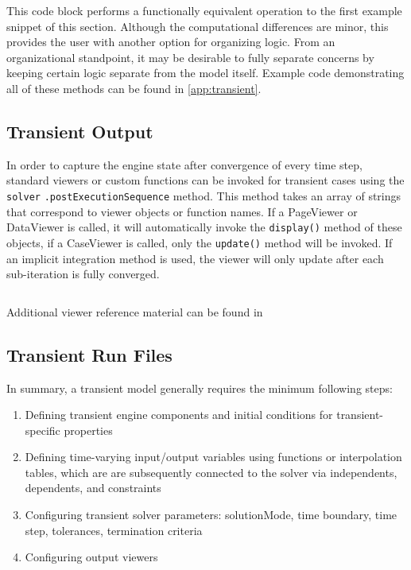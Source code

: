 \documentclass[heading.tex]{subfiles}
\begin{document}
This code block performs a functionally equivalent operation to the first example snippet of this section.
Although the computational differences are minor, this provides the user with another option for organizing logic.
From an organizational standpoint,
it may be desirable to fully separate concerns by keeping certain logic separate from the model itself.
Example code demonstrating all of these methods can be found in \cref{app:transient}.

\subsection{Transient Output}

In order to capture the engine state after convergence of every time step, standard viewers or custom functions can be
invoked for transient cases using the \texttt{solver} \texttt{.postExecutionSequence} method. This method takes an array of strings that
correspond to viewer objects or function names. If a PageViewer or DataViewer is called, it will automatically invoke the
\texttt{display()} method of these objects, if a CaseViewer is called, only the \texttt{update()} method will be invoked.
If an implicit integration method is used, the viewer will only update after each sub-iteration is fully converged.

 \begin{adjustwidth}{-1cm}{-1cm}
 \inputminted[]{c++}{code/transient1}
 \end{adjustwidth} 

Additional viewer reference material can be found in \cite[chap.~7.2.2, ~12, ~15.3.1]{NPSS}

\subsection{Transient Run Files}

In summary, a transient model generally requires the minimum following steps:

\begin{enumerate}
\item Defining transient engine components and initial conditions for transient-specific properties
\item Defining time-varying input/output variables using functions or interpolation tables,
which are are subsequently connected to the solver via independents, dependents, and constraints
\item Configuring transient solver parameters: solutionMode, time boundary, time step, tolerances, termination criteria
\item Configuring output viewers
\end{enumerate}
\end{document}
